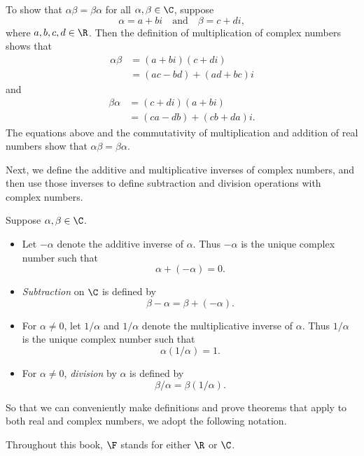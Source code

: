 \begin{example}\label{ax:1.4}
To show that $\alpha\beta=\beta\alpha$ for all $\alpha,\beta\in\C$, suppose
\[ \alpha = a+bi \quad\text{and}\quad \beta = c+di, \]
where $a,b,c,d\in\R$. Then the definition of multiplication of complex numbers
shows that
\begin{align*}
\alpha\beta &= (a+bi)(c+di)\\
            &= (ac-bd)+(ad+bc)i
\end{align*}
and
\begin{align*}
\beta\alpha &= (c+di)(a+bi)\\
            &= (ca-db)+(cb+da)i.
\end{align*}
The equations above and the commutativity of multiplication and addition of
real numbers show that $\alpha\beta=\beta\alpha$.
\end{example}

Next, we define the additive and multiplicative inverses of complex numbers,
and then use those inverses to define subtraction and division operations with
complex numbers.

\begin{definition}\label{ax:1.5}\leavevmode
Suppose $\alpha,\beta\in\C$.
\begin{itemize}
\item Let $-\alpha$ denote the additive inverse of $\alpha$. Thus $-\alpha$ is
  the unique complex number such that
  \[ \alpha+(-\alpha)=0. \]
\item \emph{Subtraction} on $\C$ is defined by
  \[ \beta-\alpha = \beta+(-\alpha). \]
\item For $\alpha\ne0$, let $1/\alpha$ and $1/\alpha$ denote the
  multiplicative inverse of $\alpha$. Thus $1/\alpha$ is the unique complex
  number such that
  \[ \alpha(1/\alpha)=1. \]
\item For $\alpha\ne0$, \emph{division} by $\alpha$ is defined by
  \[ \beta/\alpha = \beta(1/\alpha). \]
\end{itemize}
\end{definition}

So that we can conveniently make definitions and prove theorems that apply to
both real and complex numbers, we adopt the following notation.

\begin{notation}[$\F$]\label{ax:1.6}
Throughout this book, $\F$ stands for either $\R$ or $\C$.
\end{notation}

